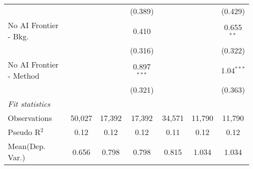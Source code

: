 \begin{tabular}{lcccccc}
                           &               &         & (0.389)       &         &         & (0.429)\\   
   No AI Frontier - Bkg.   &               &         & 0.410         &         &         & 0.655$^{**}$\\   
                           &               &         & (0.316)       &         &         & (0.322)\\   
   No AI Frontier - Method &               &         & 0.897$^{***}$ &         &         & 1.04$^{***}$\\   
                           &               &         & (0.321)       &         &         & (0.363)\\   
   \midrule
   \emph{Fit statistics}\\
   Observations            & 50,027        & 17,392  & 17,392        & 34,571  & 11,790  & 11,790\\  
   Pseudo R$^2$            & 0.12          & 0.12    & 0.12          & 0.11    & 0.12    & 0.12\\  
Mean(Dep. Var.) & 0.656 & 0.798 & 0.798 & 0.815 & 1.034 & 1.034 \\
   

\end{tabular}
